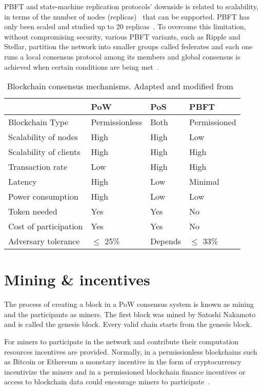 PBFT and state-machine replication protocols’ downside is related to scalability, in terms of the number of nodes (replicas)~\cite{Vukolić2016} that can be supported.
PBFT has only been scaled and studied up to 20 replicas~\cite{bl_consensus,Vukolić2016}. To overcome this limitation, without compromising security, various PBFT variants,
such as Ripple and Stellar, partition the network into smaller groups called federates and each one runs a local consensus protocol among its members and
global consensus is achieved when certain conditions are being met~\cite{DBLP:journals/corr/abs-1708-05665}.

\begin{table}[!ht]
  \centering
  \begin{tabular}{|l|l|l|l|}
    \hline
    & PoW &	PoS &	PBFT \\ \hline
    Blockchain Type &	Permissionless &	Both &	Permissioned \\ \hline
    Scalability of nodes &	High &	High &	Low \\ \hline
    Scalability of clients &	High &	High &	High \\ \hline
    Transaction rate &	Low &	High &	High \\ \hline
    Latency &	High &	Low &	Minimal \\ \hline
    Power consumption &	High &	Low &	Low \\ \hline
    Token needed &	Yes &	Yes &	No \\ \hline
    Cost of participation &	Yes &	Yes &	No \\ \hline
    Adversary tolerance &	$\leq$ 25\%	& Depends &	$\leq$ 33\% \\ \hline
  \end{tabular}
  \caption{Blockchain consensus mechanisms. Adapted and modified from~\cite{bl_consensus,Vukolić2016}}
  \label{table:blockchain_consensus}
\end{table}

\section{Mining \& incentives}\label{blockchain:mining}

The process of creating a block in a PoW consensus system is known as mining and the participants as miners. The first block was mined by Satoshi Nakamoto~\cite{nakamoto2012bitcoin} and is called the genesis block. Every valid chain starts from the genesis block.

For miners to participate in the network and contribute their computation resources incentives are provided. Normally, in a permissionless blockchains such as Bitcoin or Ethereum a monetary incentive in the form of cryptocurrency incentivize the miners and in a permissioned blockchain finance incentives or access to blockchain data could encourage miners to participate~\cite{deloitte}.

